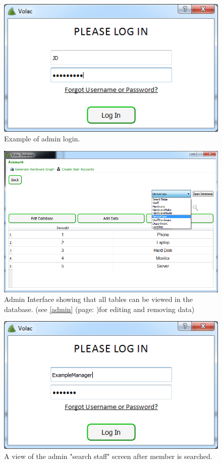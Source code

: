 \begin{figure}[H]
    \includegraphics[width=\textwidth]{./Evaluation/Images/login2.png}
    \caption{Example of admin login.} 
\end{figure}

\begin{figure}[H]
    \includegraphics[width=\textwidth]{./Evaluation/Images/admin1.png}
    \caption{Admin Interface showing that all tables can be viewed in the database. (see \ref{admin} (page: \pageref{admin})for editing and removing data)}
\end{figure}

\begin{figure}[H]
    \includegraphics[width=\textwidth]{./Evaluation/Images/login3.png}
    \caption{A view of the admin "search staff" screen after member is searched.} 
\end{figure}

